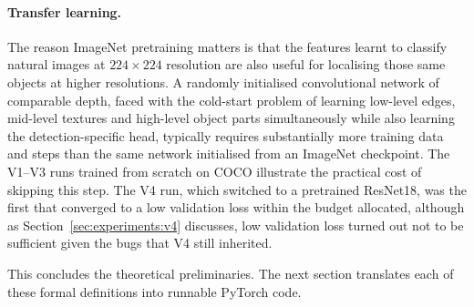 \paragraph{Transfer learning.} The reason ImageNet pretraining matters is
that the features learnt to classify natural images at $224\!\times\!224$
resolution are also useful for localising those same objects at higher
resolutions. A randomly initialised convolutional network of comparable
depth, faced with the cold-start problem of learning low-level edges,
mid-level textures and high-level object parts simultaneously while also
learning the detection-specific head, typically requires substantially more
training data and steps than the same network initialised from an ImageNet
checkpoint. The V1--V3 runs trained from scratch on COCO illustrate the
practical cost of skipping this step. The V4 run, which switched to a
pretrained ResNet18, was the first that converged to a low validation loss
within the budget allocated, although as Section~\ref{sec:experiments:v4}
discusses, low validation loss turned out not to be sufficient given the
bugs that V4 still inherited.

\medskip

This concludes the theoretical preliminaries. The next section translates
each of these formal definitions into runnable PyTorch code.
